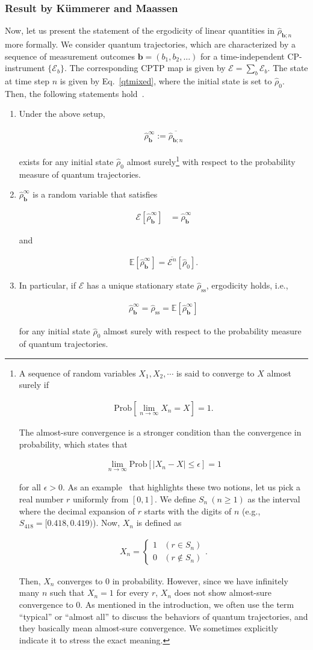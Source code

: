 \documentclass[preprint,pteplogo]{ptephy_v2}%
\numberwithin{equation}{section}
\theoremstyle{definition}
\newcommand{\ml}[1]{\mathcal{#1}}
\newcommand{\mr}[1]{\mathrm{#1}}
\newcommand{\mbb}[1]{\mathbb{#1}}
\newcommand{\lrl}[1]{\left[ #1 \right]}
\newcommand{\aln}[1]{
\begin{align}
#1
\end{align}
}
\newcommand{\ra}{\rightarrow}
\begin{document}
\subsubsection{Result by K\"ummerer and  Maassen}\label{KMerg}
Now, let us present the statement of the ergodicity of linear quantities in $\hat{\rho}_{\bm{b};n}$ more formally.
We consider quantum trajectories, which are characterized by a sequence of measurement outcomes $\bm{b}=(b_1,b_2,\ldots)$ for a time-independent CP-instrument $\{\ml{E}_b\}$.
The corresponding CPTP map is given by $\ml{E}=\sum_b\ml{E}_b$.
The state at time step $n$ is given by Eq.~\eqref{qtmixed}, where the initial state is set to $\hat{\rho}_0$.
Then, the following statements hold~\cite{kummerer2005quantum}.
\begin{enumerate}
\item 
Under the above setup, 
\aln{
\hat{\rho}_{\bm{b}}^\mr{\infty}:=\overline{\hat{\rho}_{\bm{b};n}}
}
exists for any initial state $\hat{\rho}_0$ almost surely\footnote{\label{foot:TypicalVSAlmostAll}
A sequence of random variables $X_1,X_2,\cdots$ is said to converge to $X$ almost surely if
\aln{\label{almostsure}
\mr{Prob}\lrl{\lim_{n\ra\infty}X_n=X}=1.
}
The almost-sure convergence is a stronger condition than the convergence in probability, which states that 
\aln{
\lim_{n\ra\infty}\mr{Prob}\lrl{|X_n-X|\leq\epsilon}=1
}
for all $\epsilon>0$.
As an example~\cite{tao2012topics} that highlights these two notions, let us pick a real number $r$ uniformly from $[0,1]$.
We define $S_n\:(n\geq 1)$ as the interval where the decimal expansion of $r$ starts with the digits of $n$ (e.g., $S_{418}=[0.418,0.419)$). 
Now, $X_n$ is defined as 
\aln{
X_n=
\left\{
\begin{array}{ll}
1 & (r\in S_n)\\
0 & (r\notin S_n)
\end{array}
\right..
}
Then, $X_n$ converges to $0$ in probability.
However, since we have infinitely many $n$ such that $X_n=1$ for every $r$, $X_n$ does not show almost-sure convergence to $0$.
As mentioned in the introduction, we often use the term ``typical'' or ``almost all'' to discuss the behaviors of quantum trajectories, and they basically mean almost-sure convergence.
We sometimes explicitly indicate it to stress the exact meaning.
} with respect to the probability measure of quantum trajectories.

\item 
$\hat{\rho}_{\bm{b}}^\mr{\infty}$ is a random variable that satisfies
\aln{
\ml{E}[\hat{\rho}_{\bm{b}}^\mr{\infty}]&=\hat{\rho}_{\bm{b}}^\mr{\infty}
}
and
\aln{
\mbb{E}[\hat{\rho}_{\bm{b}}^\mr{\infty}]=\overline{\ml{E}^n}[\hat{\rho}_0].
}

\item
In particular, if $\ml{E}$ has a unique stationary state $\hat{\rho}_\mr{ss}$, ergodicity holds, i.e.,
\aln{
\hat{\rho}_{\bm{b}}^\mr{\infty}=\hat{\rho}_\mr{ss}={\mathbb{E}\left[\hat{\rho}_{\bm{b}}^\mr{\infty}\right]}
\label{eq:ergodicity_rho}
}
for any initial state $\hat{\rho}_0$ almost surely with respect to the probability measure of quantum trajectories.
\end{enumerate}
\end{document}
